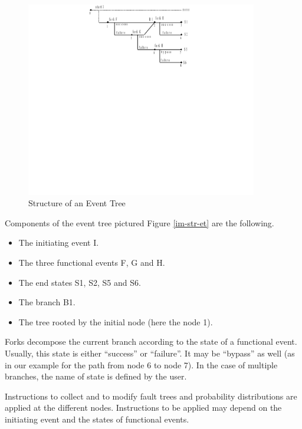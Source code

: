 \documentclass[11pt]{article}
\begin{document}
\begin{figure}[htbp]

\includegraphics[width=0.9\textwidth]{./word/media/image11.png}
\caption{\label{fig:org606a140}
Structure of an Event Tree}
\end{figure}

Components of the event tree pictured Figure \ref{im-str-et} are the following.

\begin{itemize}
\item The initiating event I.

\item The three functional events F, G and H.

\item The end states S1, S2, S5 and S6.

\item The branch B1.

\item The tree rooted by the initial node (here the node 1).
\end{itemize}

Forks decompose the current branch according to the state of a
functional event. Usually, this state is either ``success'' or ``failure''.
It may be ``bypass'' as well (as in our example for the path from node 6
to node 7). In the case of multiple branches, the name of state is
defined by the user.

Instructions to collect and to modify fault trees and probability
distributions are applied at the different nodes. Instructions to be
applied may depend on the initiating event and the states of functional
events.
\end{document}
